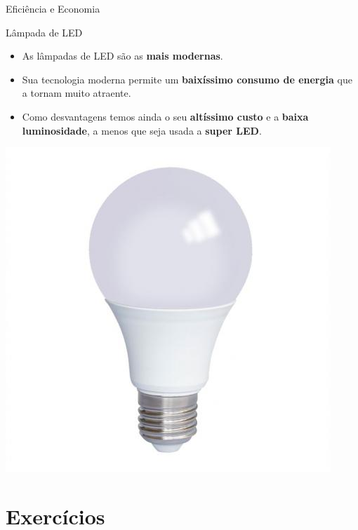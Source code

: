 \begin{frame}{Eficiência e Economia}
	\begin{block}{Lâmpada de LED}
		\begin{itemize}
			\item As lâmpadas de LED são as \textbf{mais modernas}.
			\item Sua tecnologia moderna permite um \textbf{baixíssimo consumo de energia} que a tornam muito atraente.
			\item Como desvantagens temos ainda o seu \textbf{altíssimo custo} e a \textbf{baixa luminosidade}, a menos que seja usada a \textbf{super LED}.
		\end{itemize}
	\end{block}

	\centering
	\includegraphics[height=0.5\textheight]{Figuras/Ch07/fig11}
\end{frame}


\section*{Exercícios}

